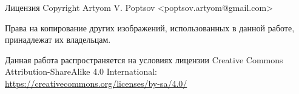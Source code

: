 \documentclass[presentation]{beamer}
\begin{document}
\begin{frame}{Лицензия}
  Copyright  Artyom V. Poptsov
  <poptsov.artyom@gmail.com> \newline

  Права на копирование других изображений, использованных в данной
  работе, принадлежат их владельцам. \newline

  Данная работа распространяется на условиях лицензии Creative Commons
  Attribution-ShareAlike 4.0 International:
  \url{https://creativecommons.org/licenses/by-sa/4.0/}
\end{frame}
\end{document}
